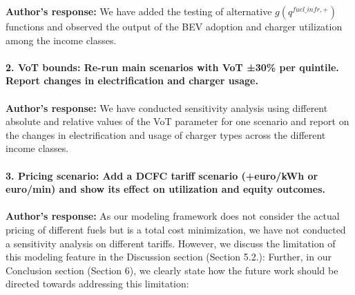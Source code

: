 \documentclass[11pt]{article}
\begin{document}
\color{authorblue}
\noindent \textcolor{authorblue}{\textbf{Author's response:}} We have added the testing of alternative $g(q^{fuel\_infr, +})$ functions and observed the output of the BEV adoption and charger utilization among the income classes. \\\\
\color{reviewergrey}
\textbf{2. VoT bounds: Re-run main scenarios with VoT ±30\% per quintile. Report changes in electrification and charger usage.} \\\\
\color{authorblue}
\noindent \textcolor{authorblue}{\textbf{Author's response:}} We have conducted sensitivity analysis using different absolute and relative values of the VoT parameter for one scenario and report on the changes in electrification and usage of charger types across the different income classes.\\\\
\color{reviewergrey}
\textbf{3. Pricing scenario: Add a DCFC tariff scenario (+euro/kWh or euro/min) and show its effect on utilization and equity outcomes.}\\\\
\color{authorblue}
\noindent \textcolor{authorblue}{\textbf{Author's response:}} As our modeling framework does not consider the actual pricing of different fuels but is a total cost minimization, we have not conducted a sensitivity analysis on different tariffs. However, we discuss the limitation of this modeling feature in the Discussion section (Section 5.2.): 
Further, in our Conclusion section (Section 6), we clearly state how the future work should be directed towards addressing this limitation:  \\\\
\end{document}
